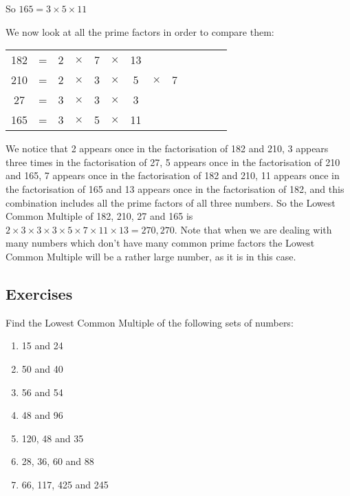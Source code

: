 \documentclass[11pt, oneside]{article}
\theoremstyle{definition}
\begin{document}
So $165 = 3\times 5 \times 11$

We now look at all the prime factors in order to compare them:

\begin{tabular}{c c c c c c c c c c c c c}
182 & = & 2 & $\times$ & 7 & $\times$ & 13 &  &  &  &  &  &  \\
210 & = & 2 & $\times$ & 3 & $\times$ & 5 & $\times$ & 7 &  &  &  & \\
27 & = & 3 & $\times$ & 3 & $\times$ & 3 &  &  &  &  &  & \\
165 & = & 3 & $\times$ & 5 & $\times$ & 11 &  &  &  &  &  & 
\end{tabular}

We notice that 2 appears once in the factorisation of 182 and 210, 3 appears three times in the factorisation of 27, 5 appears once in the factorisation of 210 and 165, 7 appears once in the factorisation of 182 and 210, 11 appears once in the factorisation of 165 and 13 appears once in the factorisation of 182, and this combination includes all the prime factors of all three numbers. So the Lowest Common Multiple of 182, 210, 27 and 165 is $2\times 3 \times 3 \times 3 \times 5 \times 7 \times 11 \times 13 = 270,270$. Note that when we are dealing with many numbers which don't have many common prime factors the Lowest Common Multiple will be a rather large number, as it is in this case.

\subsection{Exercises}
Find the Lowest Common Multiple of the following sets of numbers:
\begin{enumerate}
\item 15 and 24
\item 50 and 40
\item 56 and 54
\item 48 and 96
\item 120, 48 and 35
\item 28, 36, 60 and 88
\item 66, 117, 425 and 245
\end{enumerate}
\end{document}
